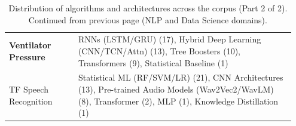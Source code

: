 \begin{table}[t!]
\begin{tabular}{
        >{\raggedright\arraybackslash\bfseries}p{0.23\linewidth} 
        >{\raggedright\arraybackslash}p{0.72\linewidth}
    }
    Ventilator Pressure & RNNs (LSTM/GRU) (17), Hybrid Deep Learning (CNN/TCN/Attn) (13), Tree Boosters (10), Transformers (9), Statistical Baseline (1) \\ \addlinespace

    TF Speech Recognition & Statistical ML (RF/SVM/LR) (21), CNN Architectures (13), Pre-trained Audio Models (Wav2Vec2/WavLM) (8), Transformer (2), MLP (1), Knowledge Distillation (1) \\
    
    \bottomrule
    \end{tabular}

    \addtocounter{table}{-1}
    \caption{Distribution of algorithms and architectures across the corpus (Part 2 of 2). Continued from previous page (NLP and Data Science domains).} 
    \label{tab:appendix_algo_dist_part2}
    
\end{table}